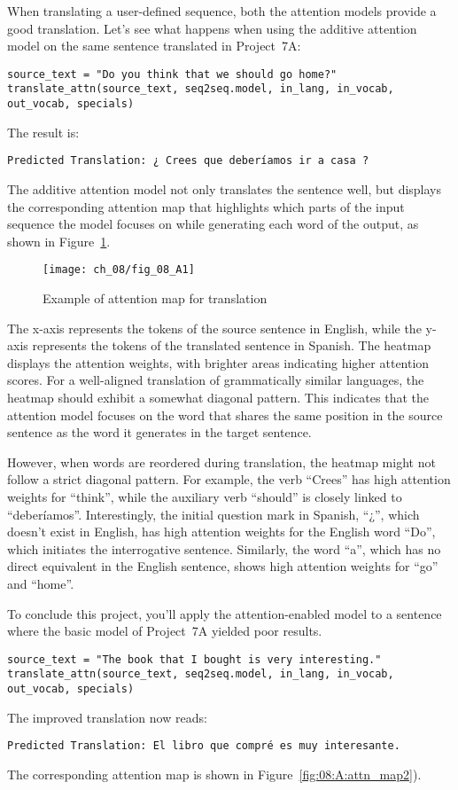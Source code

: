 When translating a user-defined sequence, both the attention models provide a good translation. Let's see what happens when using the additive attention model on the same sentence translated in Project~7A: 
\begin{lstlisting}
source_text = "Do you think that we should go home?"
translate_attn(source_text, seq2seq.model, in_lang, in_vocab, out_vocab, specials)
\end{lstlisting}
The result is:
\begin{lstlisting}
Predicted Translation: ¿ Crees que deberíamos ir a casa ?
\end{lstlisting}
The additive attention model not only translates the sentence well, but displays the corresponding attention map that highlights which parts of the input sequence the model focuses on while generating each word of the output, as shown in Figure~\ref{fig:08:A:attn_map1}.

\begin{figure}[H]
    \texttt{[image: ch\_08/fig\_08\_A1]}
    \caption{Example of attention map for translation}
    \label{fig:08:A:attn_map1}
\end{figure}

The x-axis represents the tokens of the source sentence in English, while the y-axis represents the tokens of the translated sentence in Spanish. The heatmap displays the attention weights, with brighter areas indicating higher attention scores. For a well-aligned translation of grammatically similar languages, the heatmap should exhibit a somewhat diagonal pattern. This indicates that the attention model focuses on the word that shares the same position in the source sentence as the word it generates in the target sentence.

However, when words are reordered during translation, the heatmap might not follow a strict diagonal pattern. For example, the verb ``Crees'' has high attention weights for ``think'', while the auxiliary verb ``should'' is closely linked to ``deber\'iamos''. Interestingly, the initial question mark in Spanish, ``¿'', which doesn't exist in English, has high attention weights for the English word ``Do'', which initiates the interrogative sentence. Similarly, the word ``a'', which has no direct equivalent in the English sentence, shows high attention weights for ``go'' and ``home''.

To conclude this project, you'll apply the attention-enabled model to a sentence where the basic model of Project~7A yielded poor results. 
\begin{lstlisting}
source_text = "The book that I bought is very interesting."
translate_attn(source_text, seq2seq.model, in_lang, in_vocab, out_vocab, specials)
\end{lstlisting}
The improved translation now reads:
\begin{lstlisting}
Predicted Translation: El libro que compré es muy interesante.
\end{lstlisting}
The corresponding attention map is shown in Figure~\ref{fig:08:A:attn_map2}). 

